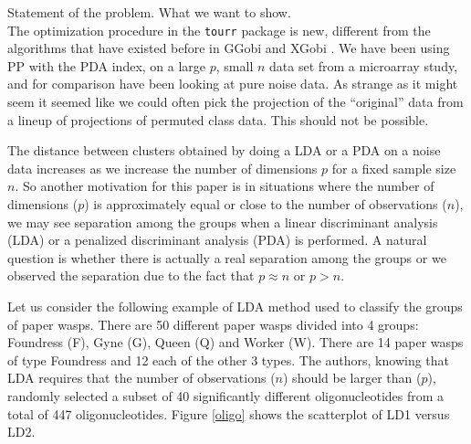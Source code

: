\documentclass[12]{article}
\begin{document}
{\color{red} Statement of the problem. What we want to show. }\\

The optimization procedure in the  \texttt{tourr} package is new, different from the algorithms that have existed before in GGobi \cite{STLBC03} and XGobi \cite{SCB91}. 
We have been using PP with the PDA index, on a large $p$, small $n$ data set from a microarray study, and for comparison have been looking at pure noise data. As strange as it might seem it seemed like we could often pick the projection of the  ``original'' data from a lineup of projections of permuted class data. This should not be possible.

The distance between clusters obtained by doing a LDA or a PDA on a noise data increases as we increase the number of dimensions $p$ for a fixed sample size $n$. So another motivation for this paper is in situations where the number of dimensions ($p$) is approximately equal or close to the number of observations ($n$), we may see separation among the groups when a linear discriminant analysis (LDA) or a penalized discriminant analysis (PDA) is performed. A natural question is whether there is actually a real separation among the groups or we observed the separation due to the fact that $p \approx n$ or $p > n$. 

Let us consider the following example of LDA method used to classify the groups of paper wasps. There are 50 different paper wasps divided into 4 groups: Foundress (F), Gyne (G), Queen (Q) and Worker (W). There are 14 paper wasps of type Foundress and 12 each of the other 3 types. The authors, knowing that LDA requires that the number of observations ($n$) should be larger than ($p$), randomly selected a subset of 40 significantly different oligonucleotides from a total of 447 oligonucleotides. Figure \ref{oligo} shows the scatterplot of LD1 versus LD2.
\end{document}
